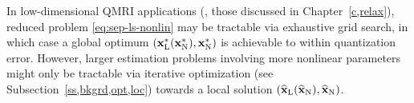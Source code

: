 In low-dimensional
QMRI applications 
(\eg, those discussed in Chapter~\ref{c,relax}), 
reduced problem \eqref{eq:sep-ls-nonlin}
may be tractable via exhaustive grid search,
in which case a global optimum 
$\paren{\bmxl^*\paren{\bmxn^*},\bmxn^*}$
is achievable to within quantization error.
However, larger estimation problems 
involving more nonlinear parameters
might only be tractable 
via iterative optimization
(see Subsection~\ref{ss,bkgrd,opt,loc})
towards a local solution 
$\paren{\est{\bmx}_\mathrm{L}\paren{\est{\bmx}_\mathrm{N}},\est{\bmx}_\mathrm{N}}$.
